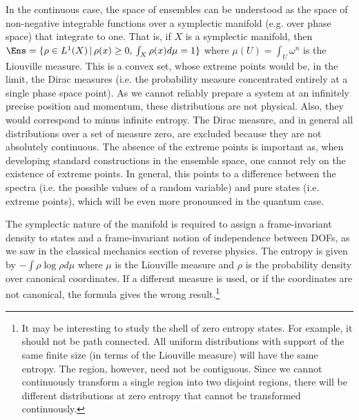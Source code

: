 In the continuous case, the space of ensembles can be understood as the space of non-negative integrable functions over a symplectic manifold (e.g.  over phase space) that integrate to one. That is, if $X$ is a symplectic manifold, then $\Ens = \{ \rho \in L^1(X) \, | \, \rho(x) \geq 0, \, \int_X \rho(x) d\mu = 1 \} $ where $\mu(U)=\int_U \omega^n$ is the Liouville measure. This is a convex set, whose extreme points would be, in the limit, the Dirac measures (i.e. the probability measure concentrated entirely at a single phase space point). As we cannot reliably prepare a system at an infinitely precise position and momentum, these distributions are not physical. Also, they would correspond to minus infinite entropy. The Dirac measure, and in general all distributions over a set of measure zero, are excluded because they are not absolutely continuous. The absence of the extreme points is important as, when developing standard constructions in the ensemble space, one cannot rely on the existence of extreme points. In general, this points to a difference between the spectra (i.e. the possible values of a random variable) and pure states (i.e. extreme points), which will be even more pronounced in the quantum case.

The symplectic nature of the manifold is required to assign a frame-invariant density to states and a frame-invariant notion of independence between DOFs, as we saw in the classical mechanics section of reverse physics. The entropy is given by $- \int \rho \log \rho d\mu$ where $\mu$ is the Liouville measure and $\rho$ is the probability density over canonical coordinates. If a different measure is used, or if the coordinates are not canonical, the formula gives the wrong result.\footnote{It may be interesting to study the shell of zero entropy states. For example, it should not be path connected. All uniform distributions with support of the same finite size (in terms of the Liouville measure) will have the same entropy. The region, however, need not be contiguous. Since we cannot continuously transform a single region into two disjoint regions, there will be different distributions at zero entropy that cannot be transformed continuously.}


